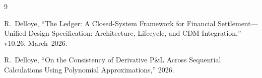 \documentclass[11pt,a4paper]{article}
\begin{document}
\clearpage
\begin{thebibliography}{9}

R.~Delloye, ``The Ledger: A Closed-System Framework for Financial Settlement---Unified Design Specification: Architecture, Lifecycle, and CDM Integration,'' v10.26, March~2026.

R.~Delloye, ``On the Consistency of Derivative P\&L Across Sequential Calculations Using Polynomial Approximations,'' 2026.

\end{thebibliography}
\end{document}
